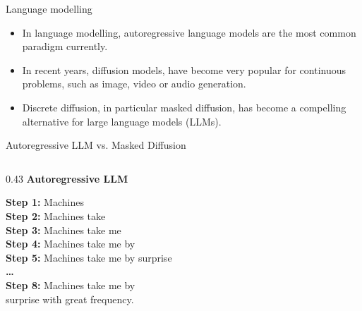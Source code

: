\documentclass[normaltitle,first=orange,second=red,leqno]{aaltoslides}
\newcommand{\redbox}[1]{\colorbox{newred}{#1}}
\newcommand{\bluebox}[1]{\colorbox{oldblue}{#1}}
\begin{document}
\begin{frame}{Language modelling}
    \begin{itemize}
        \item<1-> In language modelling, autoregressive language models are the most common paradigm currently.
        \item<2-> In recent years, diffusion models, have become very popular for continuous problems, such as image, video or audio generation.
        \item<3-> Discrete diffusion, in particular masked diffusion, has become a compelling alternative for large language models (LLMs).
    \end{itemize}
\end{frame}


\begin{frame}{Autoregressive LLM vs. Masked Diffusion}
    \begin{columns}[T]
        
        \begin{column}{0.43\textwidth}
            \centering
            \textbf{\large Autoregressive LLM}\\[0.1cm]
            
            \raggedright
            \footnotesize
            \textbf{Step 1:}
            \redbox{Machines}\\[0.25cm]
            
            \textbf{Step 2:}
            \bluebox{Machines} \redbox{take}\\[0.25cm]
            
            \textbf{Step 3:}
            \bluebox{Machines take} \redbox{me}\\[0.25cm]
            
            \textbf{Step 4:}
            \bluebox{Machines take me} \redbox{by}\\[0.25cm]

            \textbf{Step 5:}
            \bluebox{Machines take me by} \redbox{surprise}\\[0.25cm]
            
            \textbf{\dots}\\[0.25cm]
            
            \textbf{Step 8:}
            \bluebox{Machines take me by}\\
            \bluebox{surprise with great} \redbox{frequency.}\\[0.4cm]


\end{column}
\end{columns}
\end{frame}
\end{document}
